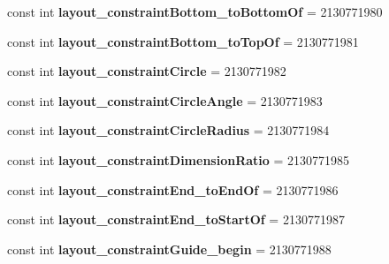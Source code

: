 \begin{DoxyCompactItemize}
const int {\bfseries layout\+\_\+constraint\+Bottom\+\_\+to\+Bottom\+Of} = 2130771980
\item 
\mbox{\label{classst_delivery_1_1_resource_1_1_attribute_af01a688f0d76440694f884a40c492f3b}} 
const int {\bfseries layout\+\_\+constraint\+Bottom\+\_\+to\+Top\+Of} = 2130771981
\item 
\mbox{\label{classst_delivery_1_1_resource_1_1_attribute_a0006fc919f2be14988b9d6b909bf1cf9}} 
const int {\bfseries layout\+\_\+constraint\+Circle} = 2130771982
\item 
\mbox{\label{classst_delivery_1_1_resource_1_1_attribute_aea3103a65dcd7e374496617f7aa2cae3}} 
const int {\bfseries layout\+\_\+constraint\+Circle\+Angle} = 2130771983
\item 
\mbox{\label{classst_delivery_1_1_resource_1_1_attribute_a4e206f62a9d17471e3900320b474a78b}} 
const int {\bfseries layout\+\_\+constraint\+Circle\+Radius} = 2130771984
\item 
\mbox{\label{classst_delivery_1_1_resource_1_1_attribute_a6110feec9971b6d2b668256f1872a4a6}} 
const int {\bfseries layout\+\_\+constraint\+Dimension\+Ratio} = 2130771985
\item 
\mbox{\label{classst_delivery_1_1_resource_1_1_attribute_a8db126b1b2d880d547e70e6399e66e85}} 
const int {\bfseries layout\+\_\+constraint\+End\+\_\+to\+End\+Of} = 2130771986
\item 
\mbox{\label{classst_delivery_1_1_resource_1_1_attribute_aaa3d89f2737ca0c06cbd808e159e29ef}} 
const int {\bfseries layout\+\_\+constraint\+End\+\_\+to\+Start\+Of} = 2130771987
\item 
\mbox{\label{classst_delivery_1_1_resource_1_1_attribute_a2a2de611801f738f122919eb14f9bcd3}} 
const int {\bfseries layout\+\_\+constraint\+Guide\+\_\+begin} = 2130771988
\item 
\mbox{\label{classst_delivery_1_1_resource_1_1_attribute_a6c67039078c9882e84c7972cebd49ecf}} 

\end{DoxyCompactItemize}
